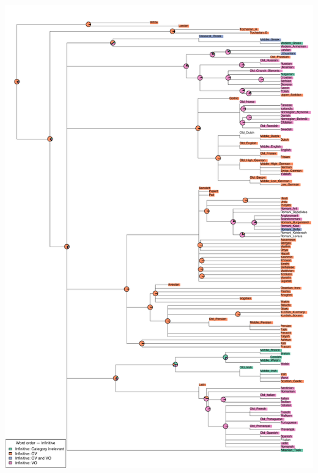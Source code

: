 \includegraphics[width=.9\linewidth]{supp-graphics/WordorderInfinitiveOVWordorderInfinitiveVO.pdf}

